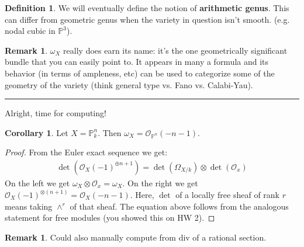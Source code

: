 \documentclass[10pt,reqno]{amsart}
\theoremstyle{definition}
\newtheorem{corollary}[theorem]{Corollary}
\newtheorem{definition}[theorem]{Definition}
\newtheorem{remark}[theorem]{Remark}
\theoremstyle{remark}
\numberwithin{equation}{section}
\numberwithin{theorem}{section}
\newcommand*{\red}{\textcolor{red}}
\newcommand{\OO}{{\mathcal O}}
\newcommand{\PP}{{\mathbb P}}
\begin{document}
\begin{definition} We will eventually define the notion of \textbf{arithmetic genus}. This can differ from geometric genus when the variety in question isn't smooth. (e.g. nodal cubic in $\PP^3$).
\end{definition}

\begin{remark} $\omega_X$ really does earn its name: it's the one geometrically significant bundle that you can easily point to. It appears in many a formula and its behavior (in terms of ampleness, etc) can be used to categorize some of the geometry of the variety (think general type vs. Fano vs. Calabi-Yau).
\end{remark}

\hrule
\vspace{1em}

Alright, time for computing!


\begin{corollary} Let $X = \PP^n_k$. Then $\omega_{X} = \OO_{\PP^n}(-n-1)$.
\end{corollary}
\begin{proof}
From the Euler exact sequence we get:
\begin{align*}
\det(\OO_X(-1)^{\oplus n+1}) = \det(\Omega_{X/k}) \otimes \det(\OO_x) 
\end{align*}
On the left we get $\omega_{X} \otimes \OO_x = \omega_X$. On the right we get $\OO_X(-1)^{\otimes (n+1)} = \OO_X(-n-1)$. Here, $\det$ of a locally free sheaf of rank $r$ means taking $\wedge^r$ of that sheaf. The equation above follows from the analogous statement for free modules (you showed this on HW 2).
\end{proof}

\begin{remark} Could also manually compute from div of a rational section. %
\end{remark}
\end{document}
